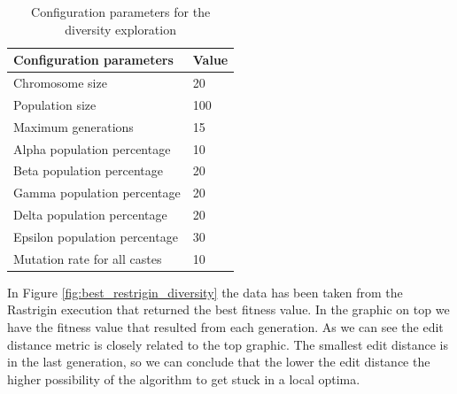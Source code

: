 \begin{table}[]
    \caption{Configuration parameters for the diversity exploration}
    \label{tab:config_file_10}
    \centering
    \begin{tabular}{|l|l|}
        \hline
        Configuration parameters &  Value \\
        \hline
        Chromosome size                   & 20      \\ \hline
        Population size                   & 100     \\ \hline
        Maximum generations               & 15      \\ \hline
        Alpha population percentage       & 10      \\ \hline
        Beta population percentage        & 20      \\ \hline
        Gamma population percentage       & 20      \\ \hline
        Delta population percentage       & 20      \\ \hline
        Epsilon population percentage     & 30      \\ \hline
        Mutation rate for all castes      & 10      \\ \hline
\end{tabular}
\end{table}

In Figure \ref{fig:best_restrigin_diversity} the data has been taken from the Rastrigin execution that returned the best
fitness value. In the graphic on top we have the fitness value that resulted from each generation. As we can see the 
edit distance metric is closely related to the top graphic. The smallest edit distance is in the last generation, so we
can conclude that the lower the edit distance the higher possibility of the algorithm to get stuck in a local optima. 

